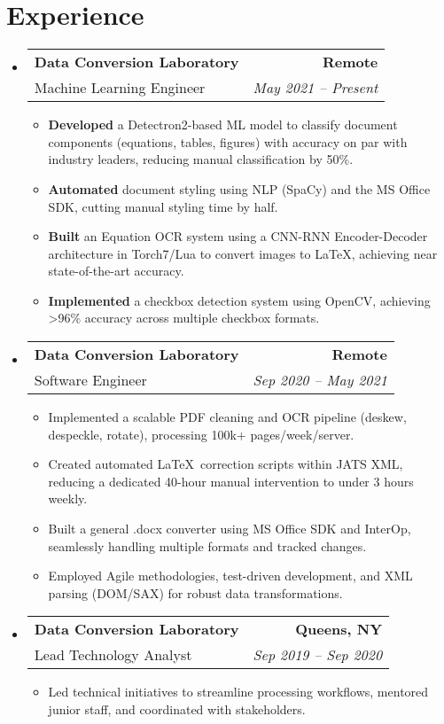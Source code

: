 \documentclass[a4paper]{article}
\makeatletter
\newcommand{\TwoRowSubheading}[4]{
  \item \begin{tabular*}{.95\textwidth}{@{}l @{\extracolsep{\fill}} r@{}}
    \textbf{#1} & \textbf{#2} \\
    {\color{gray}#3} & {\itshape #4} \\
  \end{tabular*}
}
\makeatother
\begin{document}
\section{Experience}
\begin{itemize}[leftmargin=*,label=]

\TwoRowSubheading
{Data Conversion Laboratory}
{Remote}
{Machine Learning Engineer}
{May 2021 -- Present}

\begin{itemize}[leftmargin=1em,rightmargin=1em,label=]
    \item \textbf{Developed} a Detectron2-based ML model to classify document components (equations, tables, figures) with accuracy on par with industry leaders, reducing manual classification by 50\%.
    \item \textbf{Automated} document styling using NLP (SpaCy) and the MS Office SDK, cutting manual styling time by half.
    \item \textbf{Built} an Equation OCR system using a CNN-RNN Encoder-Decoder architecture in Torch7/Lua to convert images to \LaTeX, achieving near state-of-the-art accuracy.
    \item \textbf{Implemented} a checkbox detection system using OpenCV, achieving >96\% accuracy across multiple checkbox formats.
\end{itemize}

\TwoRowSubheading
{Data Conversion Laboratory}
{Remote}
{Software Engineer}
{Sep 2020 -- May 2021}

\begin{itemize}[leftmargin=1em]
    \item Implemented a scalable PDF cleaning and OCR pipeline (deskew, despeckle, rotate), processing 100k+ pages/week/server.
    \item Created automated \LaTeX\ correction scripts within JATS XML, reducing a dedicated 40-hour manual intervention to under 3 hours weekly.
    \item Built a general .docx converter using MS Office SDK and InterOp, seamlessly handling multiple formats and tracked changes.
    \item Employed Agile methodologies, test-driven development, and XML parsing (DOM/SAX) for robust data transformations.
\end{itemize}

\TwoRowSubheading
{Data Conversion Laboratory}
{Queens, NY}
{Lead Technology Analyst}
{Sep 2019 -- Sep 2020}

\begin{itemize}[leftmargin=1em]
    \item Led technical initiatives to streamline processing workflows, mentored junior staff, and coordinated with stakeholders.
\end{itemize}


\end{itemize}
\end{document}
